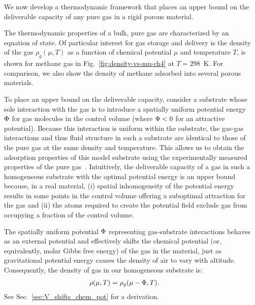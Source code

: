 We now develop a thermodynamic framework that places an upper bound on the deliverable capacity of any pure gas in a rigid porous material.

The thermodynamic properties of a bulk, pure gas are characterized by an
equation of state. Of particular interest for gas storage and delivery is the
density of the gas $\rho_g(\mu,T)$ as a function of chemical potential $\mu$
and temperature $T$, is shown for methane gas in
Fig.~\ref{fig:density-vs-mu-ch4} at $T=298$\ K. For comparison, we also show
the density of methane adsorbed into several porous materials.

To place an upper bound on the deliverable capacity, consider a substrate whose
sole interaction with the gas is to introduce a spatially uniform potential
energy $\Phi$ for gas molecules in the control volume (where $\Phi<0$ for an
attractive potential). Because this interaction is uniform within the
substrate, the gas-gas interactions and thus fluid structure in such a
substrate are identical to those of the pure gas at the same density and
temperature. This allows us to obtain the adsorption properties of this model
substrate using the experimentally measured properties of the pure
gas~\cite{nist}. Intuitively, the deliverable capacity of a gas in such a
homogeneous substrate with the optimal potential energy is an upper bound
because, in a real material, (i) spatial inhomogeneity of the potential
energy results in some points in the control volume offering a suboptimal
attraction for the gas and (ii) the atoms required to create the potential
field exclude gas from occupying a fraction of the control volume.

The spatially uniform potential $\Phi$ representing gas-substrate interactions
behaves as an external potential and effectively shifts the chemical potential
(or, equivalently, molar Gibbs free energy) of the gas in the material, just as
gravitational potential energy causes the density of air to vary with altitude.
Consequently, the density of gas in our homogeneous substrate is:
\begin{align}
    \rho(\mu,T) &= \rho_g(\mu - \Phi,T). \label{eq:mof-density}
\end{align}
See Sec.~\ref{sec:V_shifts_chem_pot} for a derivation.

